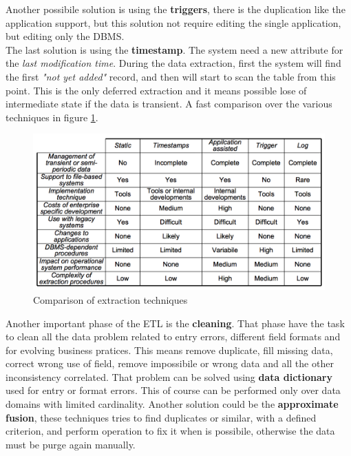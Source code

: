 \documentclass[12pt]{article}
\begin{document}
Another possibile solution is using the \textbf{triggers}, there is the duplication like the application support, but this solution not require editing the single application, but editing only the DBMS.\\
The last solution is using the \textbf{timestamp}. The system need a new attribute for the \textit{last modification time}. During the data extraction, first the system will find the first \textit{"not yet added"} record, and then will start to scan the table from this point. This is the only deferred extraction and it means possible lose of intermediate state if the data is transient. A fast comparison over the various techniques in figure \ref{fig:extraction}.

\begin{figure}[h!]
  \includegraphics[width=\linewidth]{images/extraction.png}
  \caption{Comparison of extraction techniques}
  \label{fig:extraction}
\end{figure}

Another important phase of the ETL is the \textbf{cleaning}. That phase have the task to clean all the data problem related to entry errors, different field formats and for evolving business pratices. This means remove duplicate, fill missing data, correct wrong use of field, remove impossibile or wrong data and all the other inconsistency correlated. That problem can be solved using \textbf{data dictionary} used for entry or format errors. This of course can be performed only over data domains with limited cardinality. Another solution could be the \textbf{approximate fusion}, these techniques tries to find duplicates or similar, with a defined criterion,  and perform operation to fix it when is possibile, otherwise the data must be purge again manually.\\
\end{document}
